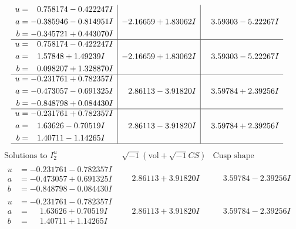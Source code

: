 \documentclass[1p]{elsarticle_modified}
\theoremstyle{definition}
\newcommand{\I}{\sqrt{-1}}
\begin{document}
$$\begin{array}{c|c|c}
\begin{aligned}
u &= \phantom{-}0.758174 - 0.422247 I \\
a &= -0.385946 - 0.814951 I \\
b &= -0.345721 + 0.443070 I\end{aligned}
 & -2.16659 + 1.83062 I & \phantom{-}3.59303 - 5.22267 I \\ \hline\begin{aligned}
u &= \phantom{-}0.758174 - 0.422247 I \\
a &= \phantom{-}1.57848 + 1.49239 I \\
b &= \phantom{-}0.098207 + 1.328870 I\end{aligned}
 & -2.16659 + 1.83062 I & \phantom{-}3.59303 - 5.22267 I \\ \hline\begin{aligned}
u &= -0.231761 + 0.782357 I \\
a &= -0.473057 - 0.691325 I \\
b &= -0.848798 + 0.084430 I\end{aligned}
 & \phantom{-}2.86113 - 3.91820 I & \phantom{-}3.59784 + 2.39256 I \\ \hline\begin{aligned}
u &= -0.231761 + 0.782357 I \\
a &= \phantom{-}1.63626 - 0.70519 I \\
b &= \phantom{-}1.40711 - 1.14265 I\end{aligned}
 & \phantom{-}2.86113 - 3.91820 I & \phantom{-}3.59784 + 2.39256 I\\
 \hline 
 \end{array}$$\newpage$$\begin{array}{c|c|c}  
\text{Solutions to }I^u_{2}& \I (\text{vol} + \sqrt{-1}CS) & \text{Cusp shape}\\
 \hline 
\begin{aligned}
u &= -0.231761 - 0.782357 I \\
a &= -0.473057 + 0.691325 I \\
b &= -0.848798 - 0.084430 I\end{aligned}
 & \phantom{-}2.86113 + 3.91820 I & \phantom{-}3.59784 - 2.39256 I \\ \hline\begin{aligned}
u &= -0.231761 - 0.782357 I \\
a &= \phantom{-}1.63626 + 0.70519 I \\
b &= \phantom{-}1.40711 + 1.14265 I\end{aligned}
 & \phantom{-}2.86113 + 3.91820 I & \phantom{-}3.59784 - 2.39256 I \\ \hline\begin{aligned}

\end{aligned}
\end{array}$$
\end{document}
